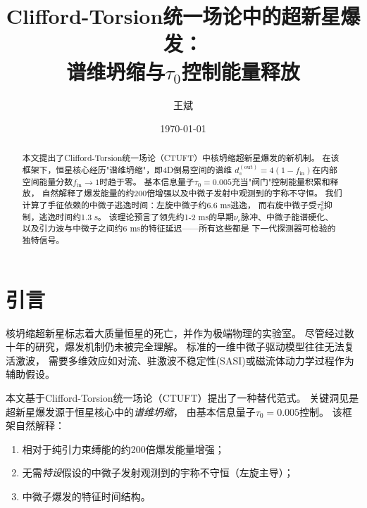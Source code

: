 \documentclass[twocolumn, tightenlines, showpacs, showkeys, nofootinbib]{revtex4-1}
\newcommand{\ctuft}{\textsc{CTUFT}}
\newcommand{\dout}{d_s^{(\text{out})}}
\newcommand{\tauzero}{\tau_0}
\begin{document}
\title{Clifford-Torsion统一场论中的超新星爆发：\\谱维坍缩与$\tau_0$控制能量释放}

\author{王斌}

\date{\today}

\begin{abstract}
本文提出了Clifford-Torsion统一场论（\ctuft）中核坍缩超新星爆发的新机制。
在该框架下，恒星核心经历"谱维坍缩"，即4D倒易空间的谱维
$\dout = 4(1-f_{\text{in}})$在内部空间能量分数$f_{\text{in}} \to 1$时趋于零。
基本信息量子$\tauzero = 0.005$充当"阀门"控制能量积累和释放，
自然解释了爆发能量的约200倍增强以及中微子发射中观测到的宇称不守恒。
我们计算了手征依赖的中微子逃逸时间：左旋中微子约6.6 ms逃逸，
而右旋中微子受$\tauzero^2$抑制，逃逸时间约1.3 s。
该理论预言了领先约1-2 ms的早期$\nu_e$脉冲、中微子能谱硬化、
以及引力波与中微子之间约6 ms的特征延迟——所有这些都是
下一代探测器可检验的独特信号。
\end{abstract}


\maketitle

\section{引言}

核坍缩超新星标志着大质量恒星的死亡，并作为极端物理的实验室。
尽管经过数十年的研究，爆发机制仍未被完全理解\citep{Bethe1990, Janka2012}。
标准的一维中微子驱动模型往往无法复活激波\citep{Burrows2021}，
需要多维效应如对流、驻激波不稳定性(SASI)或磁流体动力学过程作为辅助假设。

本文基于Clifford-Torsion统一场论（\ctuft）\citep{CTUFT2026}提出了一种替代范式。
关键洞见是超新星爆发源于恒星核心中的\emph{谱维坍缩}，
由基本信息量子$\tauzero = 0.005$控制。
该框架自然解释：
\begin{enumerate}
    \item 相对于纯引力束缚能的约200倍爆发能量增强；
    \item 无需\textit{特设}假设的中微子发射观测到的宇称不守恒（左旋主导）；
    \item 中微子爆发的特征时间结构。
\end{enumerate}
\end{document}

